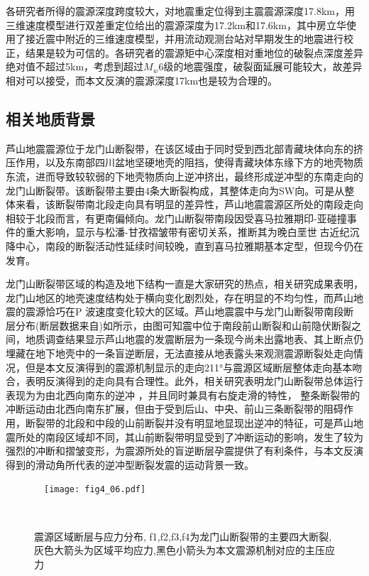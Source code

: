 各研究者所得的震源深度跨度较大，\citet{gaoyuan2013}对地震重定位得到主震震源深度17.8km，\citet{fanglihua2013}用三维速度模型进行双差重定位给出的震源深度为17.2km和17.6km，其中房立华使用了接近震中附近的三维速度模型，并用流动观测台站对早期发生的地震进行校正，结果是较为可信的。各研究者的震源矩中心深度相对重地位的破裂点深度差异绝对值不超过5km，考虑到超过$M_w$6级的地震强度，破裂面延展可能较大，故差异相对可以接受，而本文反演的震源深度17km也是较为合理的。

\subsection{相关地质背景}
芦山地震震源位于龙门山断裂带，在该区域由于同时受到西北部青藏块体向东的挤压作用，以及东南部四川盆地坚硬地壳的阻挡，使得青藏块体东缘下方的地壳物质东流，进而导致较软弱的下地壳物质向上逆冲挤出，最终形成逆冲型的东南走向的龙门山断裂带\citep{Zhang2013}。该断裂带主要由4条大断裂构成\citep{dengqidong1994,lizhiwu2008}，其整体走向为SW向。可是从整体来看，该断裂带南北段走向具有明显的差异性\citep{Jia2006,Arne1997,guozhengwu1996,dengkangling2007}，芦山地震震源区所处的南段走向相较于北段而言，有更南偏倾向。龙门山断裂带南段因受喜马拉雅期印-亚碰撞事件的重大影响，显示与松潘-甘孜褶皱带有密切关系，推断其为晚白垩世古近纪沉降中心，南段的断裂活动性延续时间较晚，直到喜马拉雅期基本定型，但现今仍在发育\citep{lizhiwu2008}。

龙门山断裂带区域的构造及地下结构一直是大家研究的热点，相关研究成果\citep{Zhang2013,Wang2010,zhangzhongjie2009,Zhang2011,leijianshe2009}表明，龙门山地区的地壳速度结构处于横向变化剧烈处，存在明显的不均匀性，而芦山地震的震源恰巧在P 波速度变化较大的区域。芦山地震震中与龙门山断裂带南段断层分布(断层数据来自\citet{dengqidong2002})如所示，由图可知震中位于南段前山断裂和山前隐伏断裂之间，地质调查结果\citep{xuxiwei2013}显示芦山地震的发震断层为一条现今尚未出露地表、其上断点仍埋藏在地下地壳中的一条盲逆断层，无法直接从地表露头来观测震源断裂处走向情况，但是本文反演得到的震源机制显示的走向211°与震源区域断层整体走向基本吻合，表明反演得到的走向具有合理性。此外，相关研究\citep{tangchangrong1991,liyong2006,Densmore2007,chenguoguang2007}表明龙门山断裂带总体运行表现为为由北西向南东的逆冲 ，并且同时兼具有右旋走滑的特性， 整条断裂带的冲断运动由北西向南东扩展，但由于受到后山、中央、前山三条断裂带的阻碍作用，断裂带的北段和中段的山前断裂并没有明显地显现出逆冲的特征，可是芦山地震所处的南段区域却不同，其山前断裂带明显受到了冲断运动的影响，发生了较为强烈的冲断和摺皱变形，为震源所处的盲逆断层孕震提供了有利条件，与本文反演得到的滑动角所代表的逆冲型断裂发震的运动背景一致。
\begin{figure}
\centering
  \texttt{[image: fig4\_06.pdf]}
  \caption{ 震源区域断层与应力分布, f1,f2,f3,f4为龙门山断裂带的主要四大断裂,灰色大箭头为区域平均应力,黑色小箭头为本文震源机制对应的主压应力}
  \label{fig4_06}
\end{figure}

